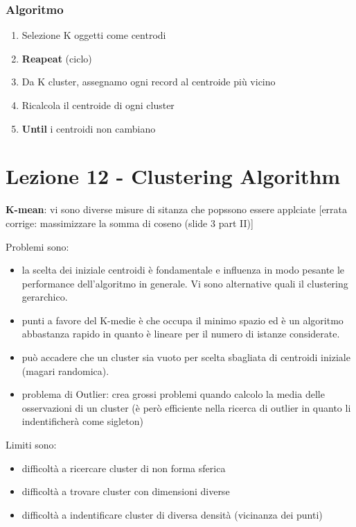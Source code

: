 \subsubsection{Algoritmo}
\begin{enumerate}
	\item Selezione K oggetti come centrodi
	\item \textbf{Reapeat} (ciclo)
	\item Da K cluster, assegnamo ogni record al centroide pi\`u vicino
	\item Ricalcola il centroide di ogni cluster
	\item \textbf{Until} i centroidi non cambiano
\end{enumerate}

\section{Lezione 12 - Clustering Algorithm}

\textbf{K-mean}: vi sono diverse misure di sitanza che popssono essere applciate [errata corrige: massimizzare la somma di coseno (slide 3 part II)]

Problemi sono:
\begin{itemize}
	\item la scelta dei iniziale centroidi \`e fondamentale e influenza in modo pesante le performance dell'algoritmo in generale. Vi sono alternative quali il clustering gerarchico.
	\item punti a favore del K-medie \`e che occupa il minimo spazio ed \`e un algoritmo abbastanza rapido in quanto \`e lineare per il numero di istanze considerate. 
	\item pu\`o accadere che un cluster sia vuoto per scelta sbagliata di centroidi iniziale (magari randomica).
	\item problema di Outlier: crea grossi problemi quando calcolo la media delle osservazioni di un cluster (\`e per\`o efficiente nella ricerca di outlier in quanto li indentificher\`a come sigleton)

\end{itemize}

Limiti sono:
\begin{itemize}
	\item difficolt\`a a ricercare cluster di non forma sferica
	\item difficolt\`a a trovare cluster con dimensioni diverse
	\item difficolt\`a a indentificare cluster di diversa densit\`a (vicinanza dei punti)
\end{itemize}

